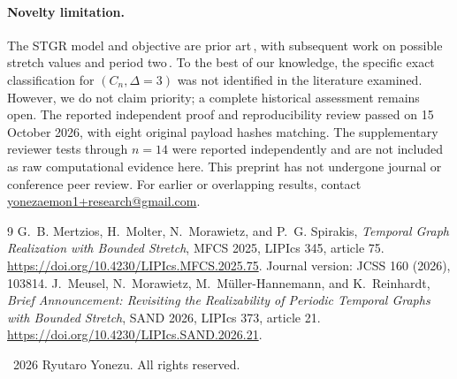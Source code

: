 \documentclass[10pt,a4paper]{article}
\begin{document}
\paragraph{Novelty limitation.}
The STGR model and objective are prior art\,\cite{mertzios2025}, with subsequent work on possible stretch values and period two\,\cite{meusel2026}. To the best of our knowledge, the specific exact classification for $(C_n,\Delta=3)$ was not identified in the literature examined. However, we do not claim priority; a complete historical assessment remains open. The reported independent proof and reproducibility review passed on 15 October 2026, with eight original payload hashes matching. The supplementary reviewer tests through $n=14$ were reported independently and are not included as raw computational evidence here. This preprint has not undergone journal or conference peer review. For earlier or overlapping results, contact \href{mailto:yonezaemon1+research@gmail.com}{yonezaemon1+research@gmail.com}.

\begin{thebibliography}{9}\setlength{\itemsep}{2pt}
 G.~B. Mertzios, H.~Molter, N.~Morawietz, and P.~G. Spirakis, \emph{Temporal Graph Realization with Bounded Stretch}, MFCS 2025, LIPIcs 345, article 75. \url{https://doi.org/10.4230/LIPIcs.MFCS.2025.75}. Journal version: JCSS 160 (2026), 103814.
 J.~Meusel, N.~Morawietz, M.~M\"uller-Hannemann, and K.~Reinhardt, \emph{Brief Announcement: Revisiting the Realizability of Periodic Temporal Graphs with Bounded Stretch}, SAND 2026, LIPIcs 373, article 21. \url{https://doi.org/10.4230/LIPIcs.SAND.2026.21}.
\end{thebibliography}
\vspace{3mm}
\noindent\footnotesize \textcopyright\ 2026 Ryutaro Yonezu. All rights reserved.
\end{document}
